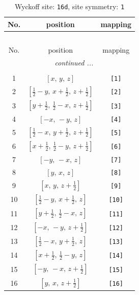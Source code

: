 \documentclass[fleqn,8pt]{jsarticle}
\begin{document}
\begin{longtable}{ccc}
\caption{Wyckoff site: {\tt 16d}, site symmetry: {\tt 1}}
 \\
 \hline \hline
No. & position & mapping \\ \hline \endfirsthead

\multicolumn{2}{l}{\tablename\ \thetable{}} \\
 \hline \hline
No. & position & mapping \\ \hline \endhead

 \hline \hline
\multicolumn{2}{r}{\footnotesize\it continued ...} \\ \endfoot

 \hline \hline
\multicolumn{2}{r}{} \\ \endlastfoot

1 & $\left[ x,\, y,\, z \right]$ & {\tt [1]} \\ \hline
2 & $\left[ \frac{1}{2} - y,\, x + \frac{1}{2},\, z + \frac{1}{2} \right]$ & {\tt [2]} \\ \hline
3 & $\left[ y + \frac{1}{2},\, \frac{1}{2} - x,\, z + \frac{1}{2} \right]$ & {\tt [3]} \\ \hline
4 & $\left[ - x,\, - y,\, z \right]$ & {\tt [4]} \\ \hline
5 & $\left[ \frac{1}{2} - x,\, y + \frac{1}{2},\, z + \frac{1}{2} \right]$ & {\tt [5]} \\ \hline
6 & $\left[ x + \frac{1}{2},\, \frac{1}{2} - y,\, z + \frac{1}{2} \right]$ & {\tt [6]} \\ \hline
7 & $\left[ - y,\, - x,\, z \right]$ & {\tt [7]} \\ \hline
8 & $\left[ y,\, x,\, z \right]$ & {\tt [8]} \\ \hline
9 & $\left[ x,\, y,\, z + \frac{1}{2} \right]$ & {\tt [9]} \\ \hline
10 & $\left[ \frac{1}{2} - y,\, x + \frac{1}{2},\, z \right]$ & {\tt [10]} \\ \hline
11 & $\left[ y + \frac{1}{2},\, \frac{1}{2} - x,\, z \right]$ & {\tt [11]} \\ \hline
12 & $\left[ - x,\, - y,\, z + \frac{1}{2} \right]$ & {\tt [12]} \\ \hline
13 & $\left[ \frac{1}{2} - x,\, y + \frac{1}{2},\, z \right]$ & {\tt [13]} \\ \hline
14 & $\left[ x + \frac{1}{2},\, \frac{1}{2} - y,\, z \right]$ & {\tt [14]} \\ \hline
15 & $\left[ - y,\, - x,\, z + \frac{1}{2} \right]$ & {\tt [15]} \\ \hline
16 & $\left[ y,\, x,\, z + \frac{1}{2} \right]$ & {\tt [16]} \\
\end{longtable}
\end{document}
